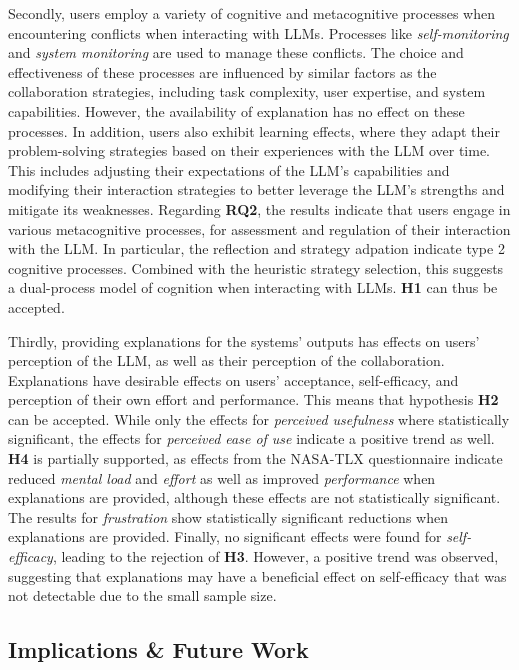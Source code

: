 Secondly, users employ a variety of cognitive and metacognitive processes when encountering conflicts when interacting with \acp{LLM}. Processes like \textit{self-monitoring} and \textit{system monitoring} are used to manage these conflicts. The choice and effectiveness of these processes are influenced by similar factors as the collaboration strategies, including task complexity, user expertise, and system capabilities. However, the availability of explanation has no effect on these processes. In addition, users also exhibit learning effects, where they adapt their problem-solving strategies based on their experiences with the \ac{LLM} over time. This includes adjusting their expectations of the \ac{LLM}'s capabilities and modifying their interaction strategies to better leverage the \ac{LLM}'s strengths and mitigate its weaknesses. Regarding \textbf{RQ2}, the results indicate that users engage in various metacognitive processes, for assessment and regulation of their interaction with the \ac{LLM}. In particular, the reflection and strategy adpation indicate type 2 cognitive processes. Combined with the heuristic strategy selection, this suggests a dual-process model of cognition when interacting with \acp{LLM}. \textbf{H1} can thus be accepted.

Thirdly, providing explanations for the systems' outputs has effects on users' perception of the \ac{LLM}, as well as their perception of the collaboration. Explanations have desirable effects on users' acceptance, self-efficacy, and perception of their own effort and performance. This means that hypothesis \textbf{H2} can be accepted. While only the effects for \textit{perceived usefulness} where statistically significant, the effects for \textit{perceived ease of use} indicate a positive trend as well. \textbf{H4} is partially supported, as effects from the \acs{NASA}-\ac{TLX} questionnaire indicate reduced \textit{mental load} and \textit{effort} as well as improved \textit{performance} when explanations are provided, although these effects are not statistically significant. The results for \textit{frustration} show statistically significant reductions when explanations are provided. Finally, no significant effects were found for \textit{self-efficacy}, leading to the rejection of \textbf{H3}. However, a positive trend was observed, suggesting that explanations may have a beneficial effect on self-efficacy that was not detectable due to the small sample size.

\subsection{Implications \& Future Work} \label{ssec:implications}

